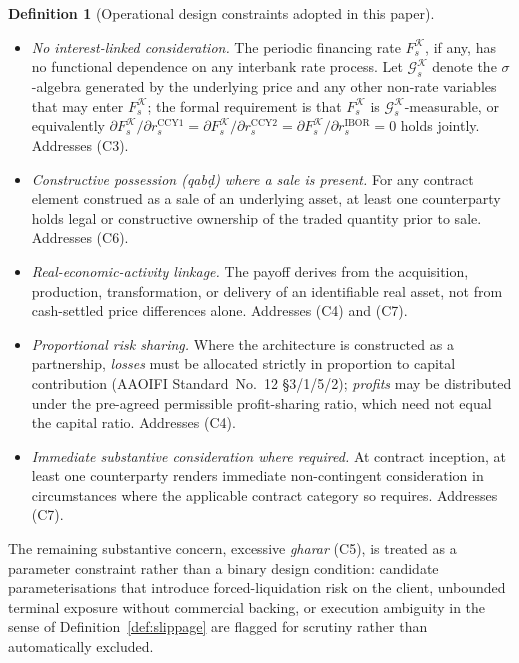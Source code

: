 \documentclass[preprint,12pt,authoryear]{elsarticle}
\theoremstyle{definition}
\newtheorem{definition}{Definition}[section]
\begin{document}
\begin{definition}[Operational design constraints adopted in this
    paper]
\begin{itemize}
    \item[(D1)] \emph{No interest-linked consideration.} The
    periodic financing rate $F_s^{\mathcal{K}}$, if any, has no
    functional dependence on any interbank rate process. Let
    $\mathcal{G}^{\mathcal{K}}_{s}$ denote the $\sigma$-algebra
    generated by the underlying price and any other
    non-rate variables that may enter $F_s^{\mathcal{K}}$; the
    formal requirement is that $F_s^{\mathcal{K}}$ is
    $\mathcal{G}^{\mathcal{K}}_{s}$-measurable, or equivalently
    $\partial F_s^{\mathcal{K}} / \partial r^{\text{CCY1}}_{s}
     = \partial F_s^{\mathcal{K}} / \partial r^{\text{CCY2}}_{s}
     = \partial F_s^{\mathcal{K}} / \partial r_s^{\text{IBOR}}
     = 0$
    holds jointly. Addresses (C3).
    \item[(D2)] \emph{Constructive possession
    (\emph{qab\d{d}}) where a sale is present.} For any contract
    element construed as a sale of an underlying asset, at least
    one counterparty holds legal or constructive ownership of the
    traded quantity prior to sale. Addresses (C6).
    \item[(D3)] \emph{Real-economic-activity linkage.} The payoff
    derives from the acquisition, production, transformation, or
    delivery of an identifiable real asset, not from cash-settled
    price differences alone. Addresses (C4) and (C7).
    \item[(D4)] \emph{Proportional risk sharing.} Where the
    architecture is constructed as a partnership,
    \emph{losses} must be allocated strictly in proportion to
    capital contribution (AAOIFI Standard~No.~12 \S3/1/5/2);
    \emph{profits} may be distributed under the pre-agreed
    permissible profit-sharing ratio, which need not equal the
    capital ratio. Addresses (C4).
    \item[(D5)] \emph{Immediate substantive consideration where
    required.} At contract inception, at least one counterparty
    renders immediate non-contingent consideration in
    circumstances where the applicable contract category so
    requires. Addresses (C7).
\end{itemize}
The remaining substantive concern, excessive
\emph{gharar} (C5), is treated as a parameter constraint
rather than a binary design condition: candidate parameterisations
that introduce forced-liquidation risk on the client, unbounded
terminal exposure without commercial backing, or execution
ambiguity in the sense of Definition~\ref{def:slippage} are
flagged for scrutiny rather than automatically excluded.
\end{definition}
\end{document}
